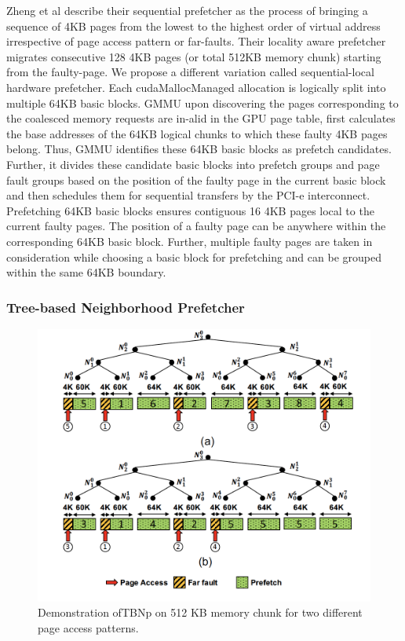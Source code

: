 Zheng et al describe their sequential prefetcher as the process of bringing a sequence of 4KB pages from the lowest to the highest order of virtual address irrespective of page access pattern or far-faults. Their locality aware prefetcher migrates consecutive 128 4KB pages (or total 512KB memory chunk) starting from the faulty-page. We propose a different variation called sequential-local hardware prefetcher. Each cudaMallocManaged allocation is logically split into multiple 64KB basic blocks. GMMU upon discovering the pages corresponding to the coalesced memory requests are in-alid in the GPU page table, first calculates the base addresses of the 64KB logical chunks to which these faulty 4KB pages belong. Thus, GMMU identifies these 64KB basic blocks as prefetch candidates. Further, it divides these candidate basic blocks into prefetch groups and page fault groups based on the position of the faulty page in the current basic block and then schedules them for sequential transfers by the PCI-e interconnect. Prefetching 64KB basic blocks ensures contiguous 16 4KB pages local to the current faulty pages. The position of a faulty page can be anywhere within the corresponding 64KB basic block. Further, multiple faulty pages are taken in consideration while choosing a basic block for prefetching and can be grouped within the same 64KB boundary.

\subsubsection{Tree-based Neighborhood Prefetcher}

    \begin{figure}[!htb]
      \centering
      \setlength{\abovecaptionskip}{6pt plus 1pt minus 1pt}
      \includegraphics[width=.90\textwidth,keepaspectratio]{figures1/prefetchers.elf}
      \captionsetup{width=.90\textwidth}
      \caption{Demonstration ofTBNp on 512 KB memory chunk for two different page access patterns.}
      \label{fig:prefetchers}
    \end{figure}

